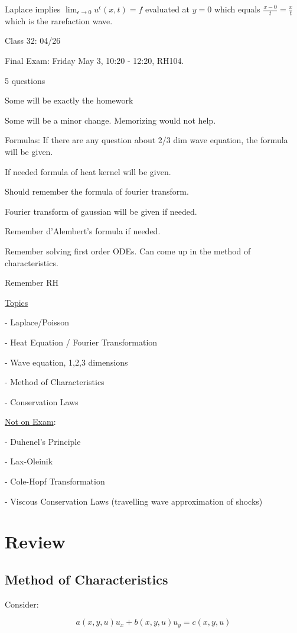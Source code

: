 \documentclass{article}
\theoremstyle{definition}
\begin{document}
Laplace implies \(\lim_{\epsilon \to 0} u^{\epsilon}(x,t) = f\) evaluated at \(y=0\) which equals \(\frac{x-0}{t}=\frac{x}{t}\) which is the rarefaction wave.   

\hrulefill

Class 32: 04/26

Final Exam: Friday May 3, 10:20 - 12:20, RH104.

5 questions

Some will be exactly the homework

Some will be a minor change. Memorizing would not help.

Formulas: If there are any question about 2/3 dim wave equation, the formula will be given.

If needed formula of heat kernel will be given.

Should remember the formula of fourier transform.

Fourier transform of gaussian will be given if needed.

Remember d'Alembert's formula if needed.

Remember solving first order ODEs. Can come up in the method of characteristics.

Remember RH

\underline{Topics}

- Laplace/Poisson

- Heat Equation / Fourier Transformation

- Wave equation, 1,2,3 dimensions

- Method of Characteristics

- Conservation Laws

\underline{Not on Exam}:

- Duhenel's Principle

- Lax-Oleinik

- Cole-Hopf Transformation

- Viscous Conservation Laws (travelling wave approximation of shocks)

\section*{Review}

\subsection*{Method of Characteristics}

Consider:

\[
    a(x,y,u) u_x + b(x,y,u) u_y = c(x,y,u)
\]
\end{document}
